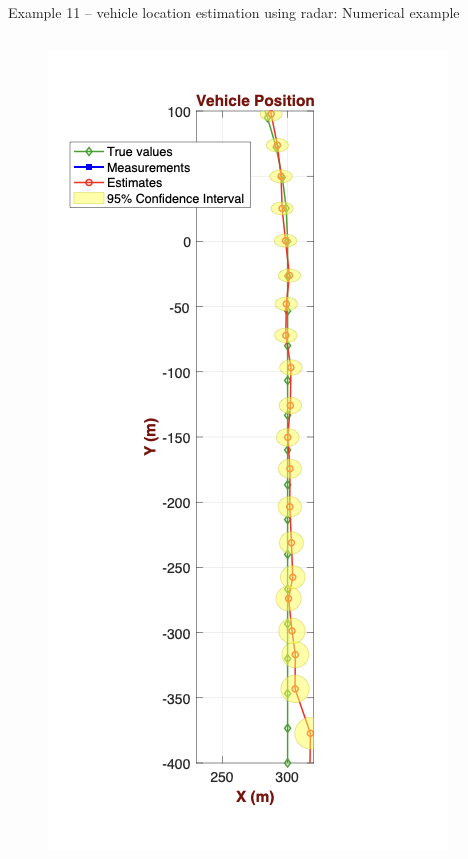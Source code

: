 \begin{frame}{Example 11 – vehicle location estimation using radar: Numerical example}
\vspace{-13pt}
\begin{columns}
\begin{figure}
    \centering
    \includegraphics[width=0.9\linewidth]{Figures//Part3/ex11_Position_Straight_Zoomed.png}
\end{figure}

\end{columns}
\end{frame}
